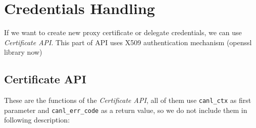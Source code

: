 %
%

\section{Credentials Handling}
\label{s:cs-auth-conn}

If we want to create new proxy certificate or \eg delegate
credentials, we can use \CANL \textit{Certificate API}.
This part of API uses X509 authentication mechanism 
(openssl library now)

\subsection{Certificate API}
These are the functions of the \textit{Certificate API}, all of them use
{\tt canl\_ctx} as first parameter and {\tt canl\_err\_code} as a return
value, so we do not include them in following description:

